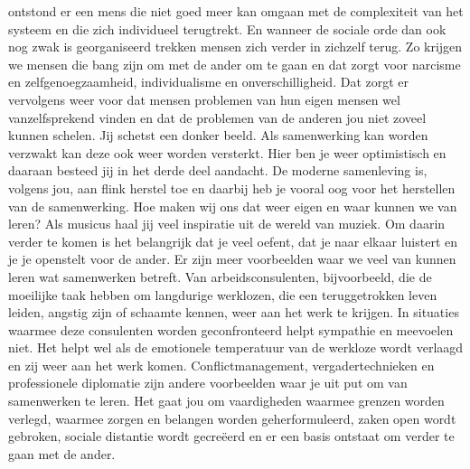 \documentclass[]{book}
\begin{document}
ontstond er een mens die niet goed meer kan omgaan met de complexiteit
van het systeem en die zich individueel terugtrekt. En wanneer de
sociale orde dan ook nog zwak is georganiseerd trekken mensen zich
verder in zichzelf terug. Zo krijgen we mensen die bang zijn om met de
ander om te gaan en dat zorgt voor narcisme en zelfgenoegzaamheid,
individualisme en onverschilligheid. Dat zorgt er vervolgens weer voor
dat mensen problemen van hun eigen mensen wel vanzelfsprekend vinden en
dat de problemen van de anderen jou niet zoveel kunnen schelen. Jij
schetst een donker beeld. Als samenwerking kan worden verzwakt kan deze
ook weer worden versterkt. Hier ben je weer optimistisch en daaraan
besteed jij in het derde deel aandacht. De moderne samenleving is,
volgens jou, aan flink herstel toe en daarbij heb je vooral oog voor het
herstellen van de samenwerking. Hoe maken wij ons dat weer eigen en waar
kunnen we van leren? Als musicus haal jij veel inspiratie uit de wereld
van muziek. Om daarin verder te komen is het belangrijk dat je veel
oefent, dat je naar elkaar luistert en je je openstelt voor de ander. Er
zijn meer voorbeelden waar we veel van kunnen leren wat samenwerken
betreft. Van arbeidsconsulenten, bijvoorbeeld, die de moeilijke taak
hebben om langdurige werklozen, die een teruggetrokken leven leiden,
angstig zijn of schaamte kennen, weer aan het werk te krijgen. In
situaties waarmee deze consulenten worden geconfronteerd helpt sympathie
en meevoelen niet. Het helpt wel als de emotionele temperatuur van de
werkloze wordt verlaagd en zij weer aan het werk komen.
Conflictmanagement, vergadertechnieken en professionele diplomatie zijn
andere voorbeelden waar je uit put om van samenwerken te leren. Het gaat
jou om vaardigheden waarmee grenzen worden verlegd, waarmee zorgen en
belangen worden geherformuleerd, zaken open wordt gebroken, sociale
distantie wordt gecreëerd en er een basis ontstaat om verder te gaan met
de ander.
\end{document}
